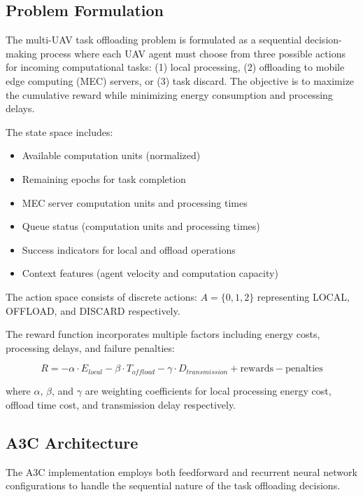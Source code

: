 
\subsection{Problem Formulation}

The multi-UAV task offloading problem is formulated as a sequential decision-making process where each UAV agent must choose from three possible actions for incoming computational tasks: (1) local processing, (2) offloading to mobile edge computing (MEC) servers, or (3) task discard. The objective is to maximize the cumulative reward while minimizing energy consumption and processing delays.

The state space includes:
\begin{itemize}
\item Available computation units (normalized)
\item Remaining epochs for task completion
\item MEC server computation units and processing times
\item Queue status (computation units and processing times)
\item Success indicators for local and offload operations
\item Context features (agent velocity and computation capacity)
\end{itemize}

The action space consists of discrete actions: $A = \{0, 1, 2\}$ representing LOCAL, OFFLOAD, and DISCARD respectively.

The reward function incorporates multiple factors including energy costs, processing delays, and failure penalties:

\begin{equation}
R = -\alpha \cdot E_{local} - \beta \cdot T_{offload} - \gamma \cdot D_{transmission} + \text{rewards} - \text{penalties}
\end{equation}

where $\alpha$, $\beta$, and $\gamma$ are weighting coefficients for local processing energy cost, offload time cost, and transmission delay respectively.

\subsection{A3C Architecture}

The A3C implementation employs both feedforward and recurrent neural network configurations to handle the sequential nature of the task offloading decisions.

